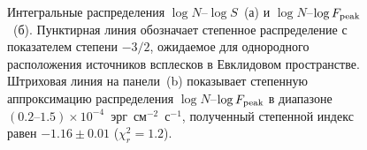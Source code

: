 \begin{figure}
    \begin{minipage}[h]{0.5\textwidth}
    \end{minipage}
    \hfill
    \begin{minipage}[h]{0.5\textwidth}
	\end{minipage}
\caption{
    Интегральные распределения $\log N$--$\log S$~(а) и $\log N$--$\log F_{\mathrm{peak}}$~(б).
    Пунктирная линия обозначает степенное распределение с показателем степени $-3/2$,
    ожидаемое для однородного расположения источников всплесков в Евклидовом пространстве.
    Штриховая линия на панели~(b) показывает степенную аппроксимацию
    распределения $\log N$--$\log F_{\mathrm{peak}}$ в диапазоне  
    $(0.2\textrm{--}1.5)\times 10^{-4}$~эрг~см$^{-2}$~с$^{-1}$, полученный степенной индекс
    равен $-1.16\pm0.01$ ($\chi^2_r = 1.2$).
    \label{fig:logNlogS_PF} }
\end{figure}
